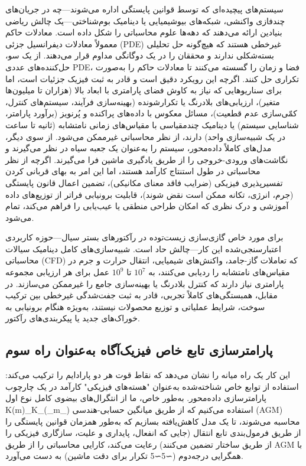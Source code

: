 \documentclass[12pt, a4paper]{article}
\begin{document}
سیستم‌های پیچیده‌ای که توسط قوانین پایستگی اداره می‌شوند—چه در جریان‌های چندفازی واکنشی، شبکه‌های بیوشیمیایی یا دینامیک بوم‌شناختی—یک چالش ریاضی بنیادین ارائه می‌دهند که دهه‌ها علوم محاسباتی را شکل داده است. معادلات حاکم معمولاً معادلات دیفرانسیل جزئی (PDE) غیرخطی هستند که هیچ‌گونه حل تحلیلی بسته‌شکلی ندارند و محققان را در یک دوگانگی مداوم قرار می‌دهند. از یک سو، حل‌کننده‌های عددی PDE، فضا و زمان را گسسته می‌کنند تا معادلات حاکم را به‌صورت تکراری حل کنند. اگرچه این رویکرد دقیق است و قادر به ثبت فیزیک جزئیات است، اما برای سناریوهایی که نیاز به کاوش فضای پارامتری با ابعاد بالا (هزاران تا میلیون‌ها متغیر)، ارزیابی‌های بلادرنگ یا تکرارشونده (بهینه‌سازی فرآیند، سیستم‌های کنترل، کمّی‌سازی عدم قطعیت)، مسائل معکوس با داده‌های پراکنده و پُرنویز (برآورد پارامتر، شناسایی سیستم) یا دینامیک چندمقیاسی با مقیاس‌های زمانی نامتشابه (ثانیه تا ساعت در یک شبیه‌سازی واحد) دارند، از نظر محاسباتی غیرممکن می‌شود. از سوی دیگر، مدل‌های کاملاً داده‌محور، سیستم را به‌عنوان یک جعبه سیاه در نظر می‌گیرند و نگاشت‌های ورودی-خروجی را از طریق یادگیری ماشین فرا می‌گیرند. اگرچه از نظر محاسباتی در طول استنتاج کارآمد هستند، اما این امر به بهای قربانی کردن تفسیرپذیری فیزیکی (ضرایب فاقد معنای مکانیکی)، تضمین اعمال قانون پایستگی (جرم، انرژی، تکانه ممکن است نقض شوند)، قابلیت برونیابی فراتر از توزیع‌های داده آموزشی و درک نظری که امکان طراحی منطقی یا عیب‌یابی را فراهم می‌کند، تمام می‌شود.

برای مورد خاص گازی‌سازی زیست‌توده در رآکتورهای بستر سیال—حوزه کاربردی اعتبارسنجی‌شده این کار—چالش حاد است. شبیه‌سازی‌های کامل دینامیک سیالات محاسباتی (CFD) که تعاملات گاز-جامد، واکنش‌های شیمیایی، انتقال حرارت و جرم در مقیاس‌های نامتشابه را ردیابی می‌کنند، به $10^{7}$ تا $10^{9}$ عمل برای هر ارزیابی مجموعه پارامتری نیاز دارند که کنترل بلادرنگ یا بهینه‌سازی جامع را غیرممکن می‌سازند. در مقابل، همبستگی‌های کاملاً تجربی، قادر به ثبت جفت‌شدگی غیرخطی بین ترکیب سوخت، شرایط عملیاتی و توزیع محصولات نیستند، به‌ویژه هنگام برونیابی به خوراک‌های جدید یا پیکربندی‌های رآکتور.

\subsection{پارامترسازی تابع خاص فیزیک‌آگاه به‌عنوان راه سوم}

این کار یک راه میانه را نشان می‌دهد که نقاط قوت هر دو پارادایم را ترکیب می‌کند: استفاده از توابع خاص شناخته‌شده به‌عنوان "هسته‌های فیزیکی" کارآمد در یک چارچوب پارامترسازی داده‌محور. به‌طور خاص، ما از انتگرال‌های بیضوی کامل نوع اول K(m)\_K\_(\_m\_) استفاده می‌کنیم که از طریق میانگین حسابی-هندسی (AGM) محاسبه می‌شوند، تا یک مدل کاهش‌یافته بسازیم که به‌طور همزمان قوانین پایستگی را از طریق فرمول‌بندی تابع انتقال (جایی که انفعال، پایداری و علیت، سازگاری فیزیکی را از طریق ساختار تضمین می‌کنند) رعایت می‌کند، کارایی محاسباتی را از طریق AGM با همگرایی درجه‌دوم (∼5∼5 تکرار برای دقت ماشین) به دست می‌آورد.
\end{document}
